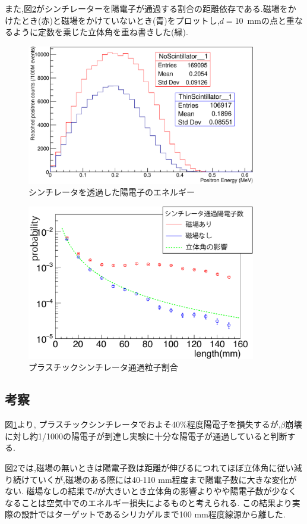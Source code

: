 また,図\ref{scinti_test}がシンチレーターを陽電子が通過する割合の距離依存である.磁場をかけたとき(赤)と磁場をかけていないとき(青)をプロットし,$d=10$\, mmの点と重なるように定数を乗じた立体角を重ね書きした(緑).


\begin{figure}[htbp]
	\centering
		\includegraphics[width=10cm]{fig/test1.pdf}
	\caption{シンチレータを透過した陽電子のエネルギー}
	\label{test1}
\end{figure}


\begin{figure}[htbp]
	\centering
		\includegraphics[width=10cm]{fig/scinti_test.pdf}
	\caption{プラスチックシンチレータ通過粒子割合}
	\label{scinti_test}
\end{figure}

\subsection{考察}

図\ref{test1}より, プラスチックシンチレータでおよそ40\%程度陽電子を損失するが,$\beta$崩壊に対し約1/1000の陽電子が到達し実験に十分な陽電子が通過していると判断する.

図\ref{scinti_test}では,磁場の無いときは陽電子数は距離が伸びるにつれてほぼ立体角に従い減り続けていくが,磁場のある際には40-110 mm程度まで陽電子数に大きな変化がない.
磁場なしの結果で$d$が大きいとき立体角の影響よりやや陽電子数が少なくなることは空気中でのエネルギー損失によるものと考えられる.
この結果より実際の設計ではターゲットであるシリカゲルまで100 mm程度線源から離した.

